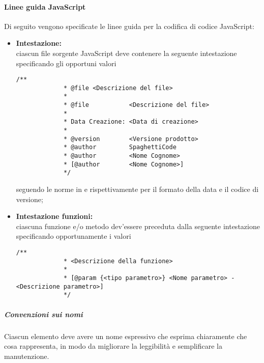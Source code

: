 \paragraph{Linee guida JavaScript}
\label{par:convenzioni_javascript}

Di seguito vengono specificate le linee guida per la codifica di codice JavaScript:
\begin{itemize}
	\item \textbf{Intestazione:} \\
		ciascun file sorgente JavaScript deve contenere la seguente intestazione specificando gli opportuni valori
		\begin{lstlisting}[style=htmlcssjs]
			/**
	 	 	 * @file <Descrizione del file>
	 	 	 *
	 	 	 * @file           <Descrizione del file>
	 	 	 *
	 	 	 * Data Creazione: <Data di creazione>
	 	 	 *
	 	 	 * @version        <Versione prodotto>
	 	 	 * @author         SpaghettiCode
	 	 	 * @author         <Nome Cognome>
	 	 	 * [@author        <Nome Cognome>]
	 	 	 */
		\end{lstlisting}
		seguendo le norme in  e  rispettivamente per il formato della data e il codice di versione;
	\item \textbf{Intestazione funzioni:} \\
		ciascuna funzione e/o metodo dev'essere preceduta dalla seguente intestazione specificando opportunamente i valori
		\begin{lstlisting}[style=htmlcssjs]
			/**
			 * <Descrizione della funzione>
			 *
			 * [@param {<tipo parametro>} <Nome parametro> - <Descrizione parametro>]
			 */
		\end{lstlisting}
\end{itemize}

\subparagraph{Convenzioni sui nomi}

Ciascun elemento deve avere un nome espressivo che esprima chiaramente che cosa rappresenta, in modo da migliorare la leggibilità e
semplificare la manutenzione.

